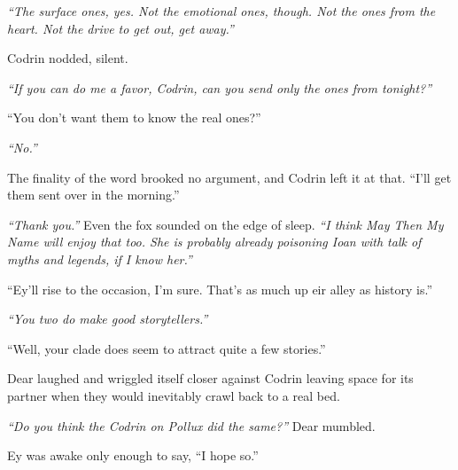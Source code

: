 \emph{``The surface ones, yes. Not the emotional ones, though. Not the ones from the heart. Not the drive to get out, get away.''}

Codrin nodded, silent.

\emph{``If you can do me a favor, Codrin, can you send only the ones from tonight?''}

``You don't want them to know the real ones?''

\emph{``No.''}

The finality of the word brooked no argument, and Codrin left it at that. ``I'll get them sent over in the morning.''

\emph{``Thank you.''} Even the fox sounded on the edge of sleep. \emph{``I think May Then My Name will enjoy that too. She is probably already poisoning Ioan with talk of myths and legends, if I know her.''}

``Ey'll rise to the occasion, I'm sure. That's as much up eir alley as history is.''

\emph{``You two do make good storytellers.''}

``Well, your clade does seem to attract quite a few stories.''

Dear laughed and wriggled itself closer against Codrin leaving space for its partner when they would inevitably crawl back to a real bed.

\emph{``Do you think the Codrin on Pollux did the same?''} Dear mumbled.

Ey was awake only enough to say, ``I hope so.''
